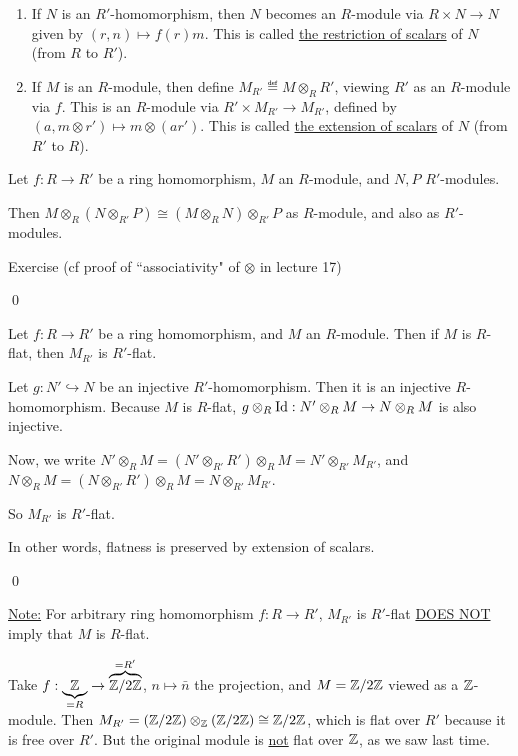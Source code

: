 \documentclass[x11names,reqno,14pt]{extarticle}
\begin{document}
\begin{enumerate}

\item If $N$ is an $R'$-homomorphism, then $N$ becomes an $R$-module via $R\times N \to N$ given by $(r, n) \mapsto f(r)m$. This is called \underline{the restriction of scalars} of $N$ (from $R$ to $R'$). 

\item If $M$ is an $R$-module, then define $M_{R'}\eqdef M\otimes_RR'$, viewing $R'$ as an $R$-module via $f$. This is an $R$-module via $R'\times M_{R'} \to M_{R'}$, defined by $(a, m\otimes r') \mapsto m\otimes(ar')$. This is called \underline{the extension of scalars} of $N$ (from $R'$ to $R$).

\end{enumerate}

\prop

Let $f:R\to R'$ be a ring homomorphism, $M$ an $R$-module, and $N, P$ $R'$-modules. 

Then $M\otimes_R(N\otimes_{R'}P) \cong (M\otimes_RN)\otimes_{R'} P$ as $R$-module, and also as $R'$-modules. 

\proof

Exercise (cf proof of ``associativity" of $\otimes$ in lecture 17)

\qed

\cor

Let $f:R\to R'$ be a ring homomorphism, and $M$ an $R$-module. Then if $M$ is $R$-flat, then $M_{R'}$ is $R'$-flat. 

\proof

Let $g:N'\hookrightarrow N$ be an injective $R'$-homomorphism. Then it is an injective $R$-homomorphism. Because $M$ is $R$-flat, $g\otimes_R\operatorname{\mathrm{Id}}:N'\otimes_RM\to N\otimes_RM$ is also injective. 

Now, we write $N'\otimes_RM=(N'\otimes_{R'}R')\otimes_RM = N'\otimes_{R'}M_{R'}$, and $N\otimes_RM = (N\otimes_{R'}R')\otimes_RM = N\otimes_{R'}M_{R'}$.

So $M_{R'}$ is $R'$-flat.

In other words, flatness is preserved by extension of scalars. 

\qed

\underline{Note:} For arbitrary ring homomorphism $f:R\to R'$, $M_{R'}$ is $R'$-flat \underline{DOES NOT} imply that $M$ is $R$-flat. 

\exm

Take $f:\underbrace{\mathbb{Z}}_{=R}\to\overbrace{\mathbb{Z}/2\mathbb{Z}}^{=R'}$, $n\mapsto \bar{n}$ the projection, and $M = \mathbb{Z}/2\mathbb{Z}$ viewed as a $\mathbb{Z}$-module. Then $M_{R'} = (\mathbb{Z}/2\mathbb{Z})\otimes_{\mathbb{Z}}(\mathbb{Z}/2\mathbb{Z}) \cong \mathbb{Z}/2\mathbb{Z}$, which is flat over $R'$ because it is free over $R'$. But the original module is \underline{not} flat over $\mathbb{Z}$, as we saw last time. 
\end{document}
